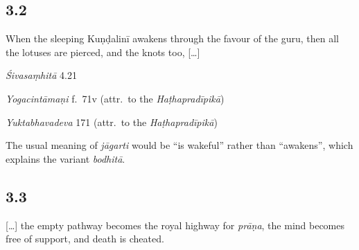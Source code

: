 \begin{ekdosis}
\subsection*{3.2}
\begin{translation}[hp03_002]
When the sleeping Kuṇḍalinī awakens through the favour of the guru, then all the lotuses are pierced, and the knots too, [\dots] 
\end{translation}

\begin{sources}[hp03_002]
\emph{Śivasaṃhitā} 4.21
\begin{versinnote}
\end{versinnote}
\end{sources}

\begin{testimonia}[hp03_002]
\emph{Yogacintāmaṇi} f.~71v (attr.~to the \emph{Haṭhapradīpikā})
\begin{versinnote}
\end{versinnote}

\emph{Yuktabhavadeva} 171 (attr.~to the \emph{Haṭhapradīpikā})
\begin{versinnote}
\end{versinnote}
\end{testimonia}

\begin{philcomm}[hp03_002]
The usual meaning of \emph{jāgarti} would be “is wakeful” rather than “awakens”, which explains the variant \emph{bodhitā}.
\end{philcomm}

\subsection*{3.3}
\begin{translation}[hp03_003]
{[}\dots] the empty pathway becomes the royal highway for \emph{prāṇa}, the mind becomes free of support, and death is cheated.
\end{translation}


\end{ekdosis}
